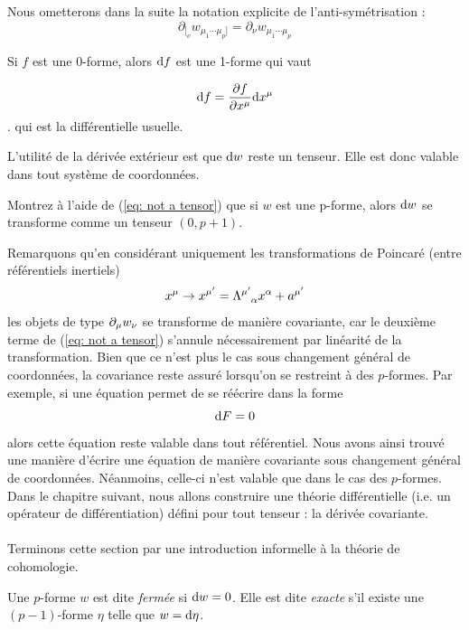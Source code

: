 Nous ometterons dans la suite la notation explicite de l'anti-symétrisation :
\begin{equation}
    \partial_{[_{\nu }}w_{\mu_1 \cdots \mu_p]} = \partial_{\nu}w_{\mu_1 \cdots \mu_p}
\end{equation}
\begin{rmk}
    Si $f $ est une 0-forme, alors $\mathrm{d} f$ est une 1-forme qui vaut
    
    \begin{equation} 
    \mathrm{d} f = \frac{\partial f}{\partial x^{\mu}}\mathrm{d} x^{\mu}
    \end{equation}.
    qui est la différentielle usuelle.
\end{rmk}
L'utilité de la dérivée extérieur est que $\mathrm{d} w$ reste un tenseur. Elle est donc valable dans tout système de coordonnées.
\begin{exerc}
    Montrez à l'aide de (\ref{eq: not a tensor}) que si $w$ est une p-forme, alors $\mathrm{d} w$ se transforme comme un tenseur $(0,p+1)$.
\end{exerc}
Remarquons qu'en considérant uniquement les transformations de Poincaré (entre référentiels inertiels)
\begin{equation}
    x^\mu \to x^{\mu'} = \Lambda\indices{^{\mu'}_\alpha}x^\alpha +a^{\mu'}
\end{equation}
les objets de type $\partial_\mu w_\nu$ se transforme de manière covariante, car le deuxième terme de (\ref{eq: not a tensor}) s'annule nécessairement par linéarité de la transformation. Bien que ce n'est plus le cas sous changement général de coordonnées, la covariance reste assuré lorsqu'on se restreint à des $p$-formes. Par exemple, si une équation permet de se réécrire dans la forme
\begin{equation}
    \mathrm{d} F = 0
\end{equation}
alors cette équation reste valable dans tout référentiel. Nous avons ainsi trouvé une manière d'écrire une équation de manière covariante sous changement général de coordonnées. Néanmoins, celle-ci n'est valable que dans le cas des $p$-formes. Dans le chapitre suivant, nous allons construire une théorie différentielle (i.e. un opérateur de différentiation) défini pour tout tenseur : la dérivée covariante.\\
\\
Terminons cette section par une introduction informelle à la théorie de cohomologie.
\begin{theoremframe}
    \begin{defi}
        Une $p$-forme $w$ est dite \emph{fermée} si $\mathrm{d} w = 0$. Elle est dite \emph{exacte} s'il existe une $(p-1)$-forme $\eta$ telle que $w=\mathrm{d} \eta$.
    \end{defi}
\end{theoremframe}
